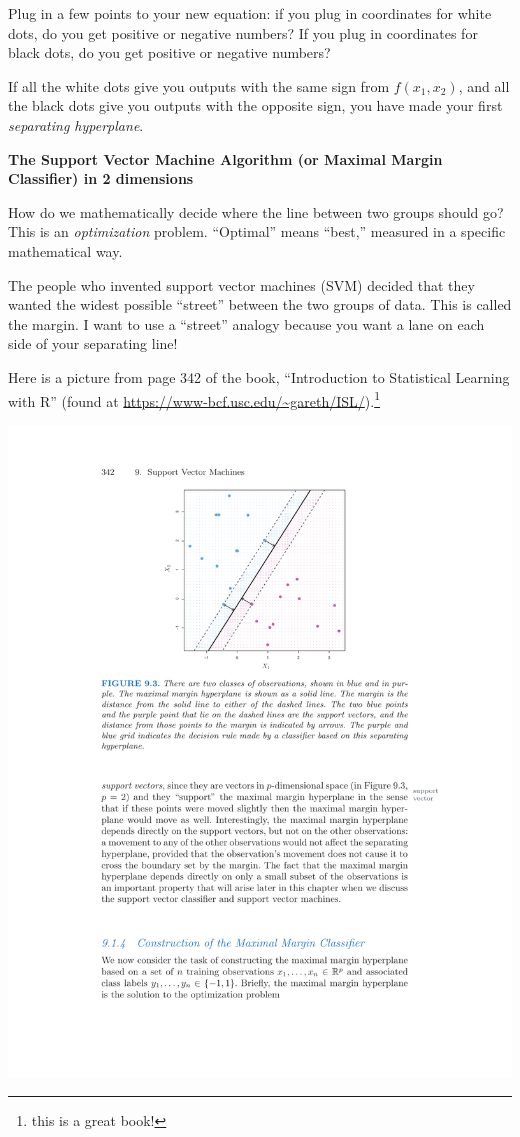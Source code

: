 \documentclass[10pt]{article}
\begin{document}
Plug in a few points to your new equation: if you plug in coordinates for white dots, do you get positive or negative numbers? If you plug in coordinates for black dots, do you get positive or negative numbers?
\vfill

If all the white dots give you outputs with the same sign from $f(x_1,x_2)$, and all the black dots give you outputs with the opposite sign, you have made your first \textit{separating hyperplane}.
\pagebreak

\begin{center}
\bf{The Support Vector Machine Algorithm (or Maximal Margin Classifier) in 2 dimensions}
\end{center}


How do we mathematically decide where the line between two groups should go? This is an \textit{optimization} problem. ``Optimal'' means ``best,'' measured in a specific mathematical way.

The people who invented support vector machines (SVM) decided that they wanted the widest possible ``street'' between the two groups of data. This is called the margin. I want to use a ``street'' analogy because you want a lane on each side of your separating line!

Here is a picture from page 342 of the book, ``Introduction to Statistical Learning with R'' (found at \url{https://www-bcf.usc.edu/~gareth/ISL/}).\footnote{this is a great book!}
\begin{center}
\includegraphics{StatLearningMarginPage357.pdf}
\end{center}
\end{document}
